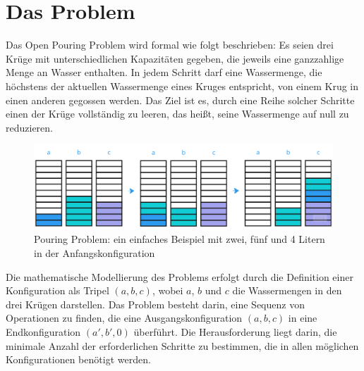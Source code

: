 \chapter{Das Problem}
Das Open Pouring Problem wird formal wie folgt beschrieben: Es seien drei Krüge mit unterschiedlichen Kapazitäten gegeben, die jeweils eine ganzzahlige Menge an Wasser enthalten. 
In jedem Schritt darf eine Wassermenge, die höchstens der aktuellen Wassermenge eines Kruges entspricht, von einem Krug in einen anderen gegossen werden. Das Ziel ist es, durch eine Reihe solcher Schritte einen der Krüge vollständig zu leeren, das heißt, seine Wassermenge auf null zu reduzieren.

\begin{figure}[H]
    \centering
    \includegraphics[page=1, width=1\textwidth]{./bilder/Pouring_Problem_1.png} 
    \caption{Pouring Problem: ein einfaches Beispiel mit zwei, fünf und 4 Litern in der Anfangskonfiguration} 
    \label{fig:pouring_problem_die_hard}
\end{figure}

Die mathematische Modellierung des Problems erfolgt durch die Definition einer Konfiguration als Tripel $(a, b, c)$, wobei $a$, $b$ und $c$ die Wassermengen in den drei Krügen darstellen. Das Problem besteht darin, eine Sequenz von Operationen zu finden, die eine Ausgangskonfiguration $(a, b, c)$ in eine Endkonfiguration $(a', b', 0)$ überführt. Die Herausforderung liegt darin, die minimale Anzahl der erforderlichen Schritte zu bestimmen, die in allen möglichen Konfigurationen benötigt werden.